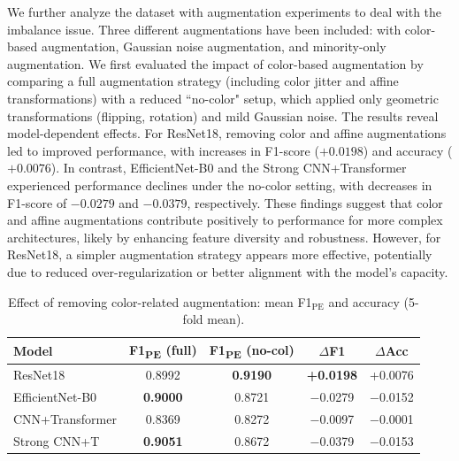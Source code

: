 \documentclass[preprint,12pt,authoryear]{elsarticle}
\begin{document}
We further analyze the dataset with augmentation experiments to deal with the imbalance issue. Three different augmentations have been included: with color-based augmentation, Gaussian noise augmentation, and minority-only augmentation. We first evaluated the impact of color-based augmentation by comparing a full augmentation strategy (including color jitter and affine transformations) with a reduced ``no-color" setup, which applied only geometric transformations (flipping, rotation) and mild Gaussian noise. The results reveal model-dependent effects. For ResNet18, removing color and affine augmentations led to improved performance, with increases in F1-score ($+0.0198$) and accuracy ($+0.0076$). In contrast, EfficientNet-B0 and the Strong CNN+Transformer experienced performance declines under the no-color setting, with decreases in F1-score of $-0.0279$ and $-0.0379$, respectively. These findings suggest that color and affine augmentations contribute positively to performance for more complex architectures, likely by enhancing feature diversity and robustness. However, for ResNet18, a simpler augmentation strategy appears more effective, potentially due to reduced over-regularization or better alignment with the model's capacity.


\begin{table}
  \caption{Effect of removing color-related augmentation: mean F1$_{\mathrm{PE}}$ and accuracy (5-fold mean).}
  \label{tab:no_color_delta}
  \centering
  \begin{tabular}{lcccc}
    \toprule
    \textbf{Model}
      & \textbf{F1\textsubscript{PE} (full)}
      & \textbf{F1\textsubscript{PE} (no-col)}
      & \textbf{$\Delta$F1}
      & \textbf{$\Delta$Acc} \\
    \midrule
    ResNet18
      & 0.8992 & \textbf{0.9190} & \textbf{+0.0198} & +0.0076 \\
    EfficientNet-B0
      & \textbf{0.9000} & 0.8721 & $-$0.0279 & $-$0.0152 \\
    CNN+Transformer
      & 0.8369 & 0.8272 & $-$0.0097 & $-$0.0001 \\
    Strong CNN+T
      & \textbf{0.9051} & 0.8672 & $-$0.0379 & $-$0.0153 \\
    \bottomrule
  \end{tabular}
\end{table}
\end{document}
